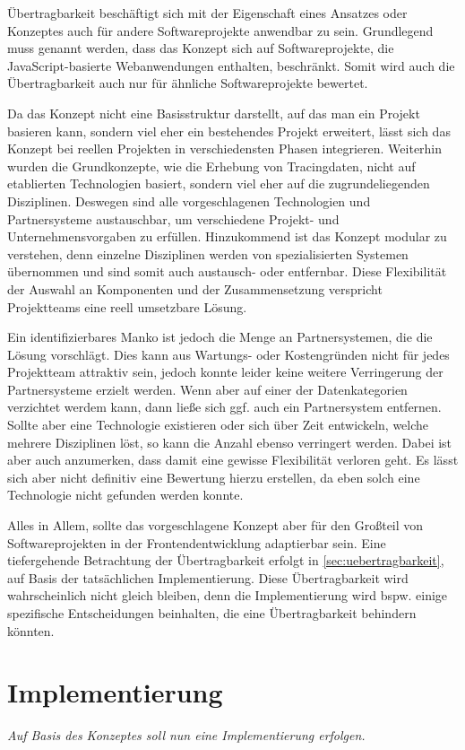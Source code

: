 	Übertragbarkeit beschäftigt sich mit der Eigenschaft eines Ansatzes oder Konzeptes auch für andere Softwareprojekte anwendbar zu sein. Grundlegend muss genannt werden, dass das Konzept sich auf Softwareprojekte, die JavaScript-basierte Webanwendungen enthalten, beschränkt. Somit wird auch die Übertragbarkeit auch nur für ähnliche Softwareprojekte bewertet.
	
	Da das Konzept nicht eine Basisstruktur darstellt, auf das man ein Projekt basieren kann, sondern viel eher ein bestehendes Projekt erweitert, lässt sich das Konzept bei reellen Projekten in verschiedensten Phasen integrieren. Weiterhin wurden die Grundkonzepte, wie die Erhebung von Tracingdaten, nicht auf etablierten Technologien basiert, sondern viel eher auf die zugrundeliegenden Disziplinen. Deswegen sind alle vorgeschlagenen Technologien und Partnersysteme austauschbar, um verschiedene Projekt- und Unternehmensvorgaben zu erfüllen. Hinzukommend ist das Konzept modular zu verstehen, denn einzelne Disziplinen werden von spezialisierten Systemen übernommen und sind somit auch austausch- oder entfernbar. Diese Flexibilität der Auswahl an Komponenten und der Zusammensetzung verspricht Projektteams eine reell umsetzbare Lösung.

	Ein identifizierbares Manko ist jedoch die Menge an Partnersystemen, die die Lösung vorschlägt. Dies kann aus Wartungs- oder Kostengründen nicht für jedes Projektteam attraktiv sein, jedoch konnte leider keine weitere Verringerung der Partnersysteme erzielt werden. Wenn aber auf einer der Datenkategorien verzichtet werdem kann, dann ließe sich ggf. auch ein Partnersystem entfernen. Sollte aber eine Technologie existieren oder sich über Zeit entwickeln, welche mehrere Disziplinen löst, so kann die Anzahl ebenso verringert werden. Dabei ist aber auch anzumerken, dass damit eine gewisse Flexibilität verloren geht. Es lässt sich aber nicht definitiv eine Bewertung hierzu erstellen, da eben solch eine Technologie nicht gefunden werden konnte.
	
	Alles in Allem, sollte das vorgeschlagene Konzept aber für den Großteil von Softwareprojekten in der Frontendentwicklung adaptierbar sein. Eine tiefergehende Betrachtung der Übertragbarkeit erfolgt in \autoref{sec:uebertragbarkeit}, auf Basis der tatsächlichen Implementierung. Diese Übertragbarkeit wird wahrscheinlich nicht gleich bleiben, denn die Implementierung wird bspw. einige spezifische Entscheidungen beinhalten, die eine Übertragbarkeit behindern könnten.

\section{Implementierung}

	\textit{Auf Basis des Konzeptes soll nun eine Implementierung erfolgen.}